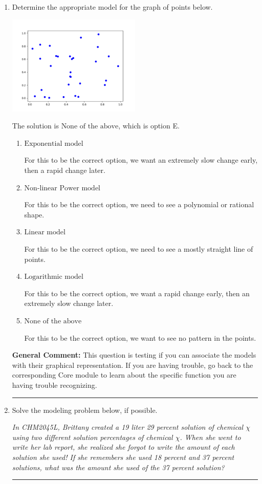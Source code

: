 \documentclass{extbook}[14pt]
\newcommand{\litem}[1]{\item #1

\rule{\textwidth}{0.4pt}}
\begin{document}
\begin{enumerate}\litem{
Determine the appropriate model for the graph of points below.

\begin{center}
    \includegraphics[width=0.5\textwidth]{../Figures/identifyModelGraph12C.png}
\end{center}




The solution is \( \text{None of the above} \), which is option E.\begin{enumerate}[label=\Alph*.]
\item \( \text{Exponential model} \)

For this to be the correct option, we want an extremely slow change early, then a rapid change later.
\item \( \text{Non-linear Power model} \)

For this to be the correct option, we need to see a polynomial or rational shape.
\item \( \text{Linear model} \)

For this to be the correct option, we need to see a mostly straight line of points.
\item \( \text{Logarithmic model} \)

For this to be the correct option, we want a rapid change early, then an extremely slow change later.
\item \( \text{None of the above} \)

For this to be the correct option, we want to see no pattern in the points.
\end{enumerate}

\textbf{General Comment:} This question is testing if you can associate the models with their graphical representation. If you are having trouble, go back to the corresponding Core module to learn about the specific function you are having trouble recognizing.
}
\litem{
Solve the modeling problem below, if possible.

\begin{center}
    \textit{ In CHM2045L, Brittany created a 19 liter 29 percent solution of chemical $\chi$ using two different solution percentages of chemical $\chi$. When she went to write her lab report, she realized she forgot to write the amount of each solution she used! If she remembers she used 18 percent and 37 percent solutions, what was the amount she used of the 37 percent solution? }
\end{center}


}
\end{enumerate}
\end{document}
